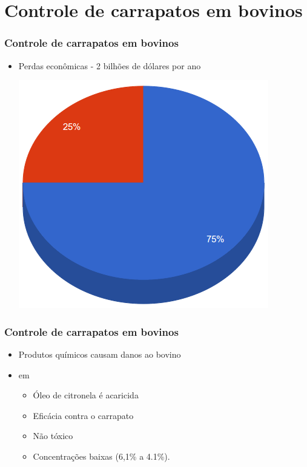 \documentclass[aspectratio=169]{beamer}
\begin{document}
\section{Controle de carrapatos em bovinos}
\begin{frame}
\frametitle{Controle de carrapatos em bovinos}
	
	\begin{itemize}
		\item Perdas econômicas - 2 bilhões de dólares por ano \cite{grisi2002}
		
			\includegraphics[scale=0.3]{imgs/grafico_perdas_economicas.png} 
			
			\color{blue}{75\% -- Carrapatos}
			
			\color{red}{25\% -- Outros parasitas}
	\end{itemize}
	
\end{frame}

\begin{frame}
\frametitle{Controle de carrapatos em bovinos}
	
	\begin{itemize}
		\item Produtos químicos causam danos ao bovino \cite{chagas2003}
		
		
		\item \citeauthor{clair2008} em \citeyear{clair2008}
		\begin{itemize}

			\item Óleo de citronela é acaricida \pause
			\item Eficácia contra o carrapato \pause
			\item Não tóxico \pause
			\item Concentrações baixas (6,1\% a 4.1\%).
					
		\end{itemize}
	\end{itemize}
	
\end{frame}
\end{document}
